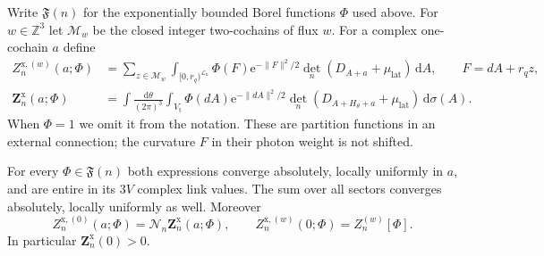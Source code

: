 \documentclass[11pt,letterpaper,reqno]{amsart}
\newcommand{\Z}{\mathbb Z}
\newcommand{\dd}{\mathrm d}
\begin{document}
Write $\mathfrak F(n)$ for the exponentially bounded
Borel functions $\Phi$ used above. For $w\in\Z^3$ let
$\mathcal M_w$ be the closed integer two-cochains of
flux $w$. For a complex one-cochain $a$ define
\begin{align}
 Z_n^{\mathrm{x},(w)}(a;\Phi)
  &=\sum_{z\in\mathcal M_w}\int_{[0,r_q)^{\mathcal L_n}}
       \Phi(F)\mathrm e^{-\|F\|^2/2}
                \det_n(D_{A+a}+\mu_{\mathrm{lat}})\,\dd A,
       \qquad F=dA+r_qz,\label{eq:external-sector-source}\\
 \mathbf Z_n^{\mathrm{x}}(a;\Phi)
  &=\int\frac{\dd\theta}{(2\pi)^3}
       \int_{V_{\mathrm t}}\Phi(dA)\mathrm e^{-\|dA\|^2/2}
       \det_n(D_{A+H_\theta+a}+\mu_{\mathrm{lat}})\,\dd\sigma(A).
                                  \label{eq:external-averaged-source}
\end{align}
When $\Phi=1$ we omit it from the notation. These are
partition functions in an external connection; the
curvature $F$ in their photon weight is not shifted.

\begin{proposition}\label{prop:external-entire}
For every $\Phi\in\mathfrak F(n)$ both expressions
converge absolutely, locally uniformly in $a$, and are
entire in its $3V$ complex link values. The sum over
all sectors converges absolutely, locally uniformly
as well. Moreover
\begin{equation}\label{eq:external-source-zero-sector}
 Z_n^{\mathrm{x},(0)}(a;\Phi)
             =\mathcal N_n\mathbf Z_n^{\mathrm{x}}(a;\Phi),
 \qquad
 Z_n^{\mathrm{x},(w)}(0;\Phi)=Z_n^{(w)}[\Phi].
\end{equation}
In particular $\mathbf Z_n^{\mathrm{x}}(0)>0$.
\end{proposition}
\end{document}

